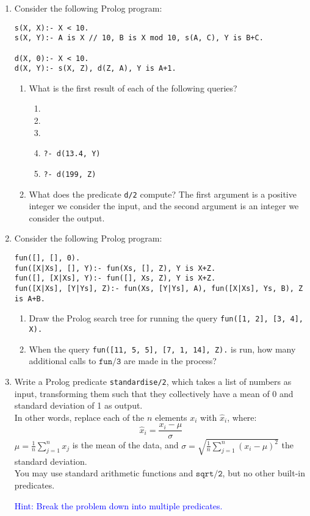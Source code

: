 \documentclass[a4paper, 12pt]{article}
\begin{document}
\begin{enumerate}

\item Consider the following Prolog program:
\begin{lstlisting}
s(X, X):- X < 10.
s(X, Y):- A is X // 10, B is X mod 10, s(A, C), Y is B+C.

d(X, 0):- X < 10. 
d(X, Y):- s(X, Z), d(Z, A), Y is A+1.
\end{lstlisting}
\begin{enumerate}
    \item What is the first result of each of the following queries?
    \begin{enumerate}
        \item {}
        \item {}
        \item {}
        \item \texttt{?- d(13.4, Y)}
        \item \texttt{?- d(199, Z)}
    \end{enumerate}
    \item What does the predicate \texttt{d/2} compute? 
    The first argument is a positive integer we consider the input, and the second argument is an integer we consider the output.
\end{enumerate}

\item Consider the following Prolog program:
\begin{lstlisting}
fun([], [], 0).
fun([X|Xs], [], Y):- fun(Xs, [], Z), Y is X+Z.
fun([], [X|Xs], Y):- fun([], Xs, Z), Y is X+Z.
fun([X|Xs], [Y|Ys], Z):- fun(Xs, [Y|Ys], A), fun([X|Xs], Ys, B), Z is A+B.
\end{lstlisting}
\begin{enumerate}
    \item Draw the Prolog search tree for running the query \texttt{fun([1, 2], [3, 4], X).}
    \item When the query \texttt{fun([11, 5, 5], [7, 1, 14], Z).} is run, how many additional calls to $\texttt{fun/3}$ are made in the process?
\end{enumerate}

\item Write a Prolog predicate \texttt{standardise/2}, which takes a list of numbers as input, transforming them such that they collectively have a mean of 0 and standard deviation of 1 as output. \\
In other words, replace each of the $n$ elements $x_i$ with $\hat{x}_i$, where: 
\begin{equation*}
    \hat{x}_i = \frac{x_i - \mu}{\sigma}
\end{equation*}
$\mu = \frac{1}{n} \sum_{j=1}^n x_j$ is the mean of the data, and $\sigma = \sqrt{\frac{1}{n} \sum_{j=1}^n (x_i - \mu)^2}$ the standard deviation. \\
You may use standard arithmetic functions and $\texttt{sqrt/2}$, but no other built-in predicates.

{ \small \textcolor{blue}{Hint: Break the problem down into multiple predicates.} }

\end{enumerate}
\end{document}
